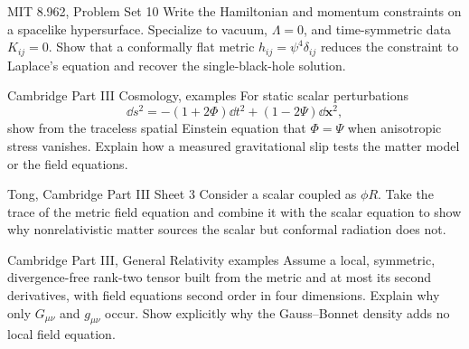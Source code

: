 \begin{exercise}{MIT 8.962, Problem Set 10}
Write the Hamiltonian and momentum constraints on a spacelike hypersurface.
Specialize to vacuum, \(\Lambda=0\), and time-symmetric data
\(K_{ij}=0\).  Show that a conformally flat metric
\(h_{ij}=\psi^4\delta_{ij}\) reduces the constraint to Laplace's equation and
recover the single-black-hole solution.
\end{exercise}

\begin{exercise}{Cambridge Part III Cosmology, examples}
For static scalar perturbations
\[
\dd s^2=-(1+2\Phi)\dd t^2+(1-2\Psi)\dd\bm x^2,
\]
show from the traceless spatial Einstein equation that
\(\Phi=\Psi\) when anisotropic stress vanishes.  Explain how a measured
gravitational slip tests the matter model or the field equations.
\end{exercise}

\begin{exercise}{Tong, Cambridge Part III Sheet 3}
Consider a scalar coupled as \(\phi R\).  Take the trace of the metric field
equation and combine it with the scalar equation to show why nonrelativistic
matter sources the scalar but conformal radiation does not.
\end{exercise}

\begin{exercise}{Cambridge Part III, General Relativity examples}
Assume a local, symmetric, divergence-free rank-two tensor built from the
metric and at most its second derivatives, with field equations second order
in four dimensions.  Explain why only \(G_{\mu\nu}\) and \(g_{\mu\nu}\) occur.
Show explicitly why the Gauss--Bonnet density adds no local field equation.
\end{exercise}
